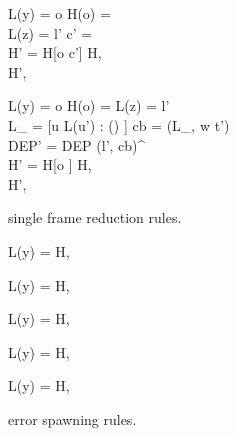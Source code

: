 \begin{figure}[h]
  {L(y) = o \andalso H(o) =  \\
  L(z) = l' \andalso c' =  \\
  H' = H[o \mapsto c']}
  {H,  \; \FRedTo \\
  H', }

  \RuleSpace{}

  {L(y) = o \andalso H(o) =  \andalso L(z) = l' \\
  L_{} = [u \mapsto L(u') : () \in {}]
  \andalso cb = (L_{}, w \Rightarrow t') \\
  \iota{} \andalso DEP' = DEP \cup (l', cb)^\iota \\
  H' = H[o \mapsto {}] }
  { H,  \\ \FRedTo \;
  H',  }
  \caption{\RACL{} single frame reduction rules.}
  \label{fig:frame_red_rules}
\end{figure}


\begin{figure}
  {L(y) = \NullVal}
  {H,  \; \FRedTo \; \Error}

  \RuleSpace{}

  {L(y) = \NullVal}
  {H,  \; \FRedTo \; \Error}

  \RuleSpace{}

  {L(y) = \NullVal}
  {H,  \; \FRedTo \; \Error}

  \RuleSpace{}

  {L(y) = \NullVal}
  {H,  \; \FRedTo \; \Error}

  \RuleSpace{}

  {L(y) = \NullVal}
  {H,   \\ \FRedTo \; \Error}
  \caption{\RACL{} error spawning rules.}
  \label{fig:error_red_rules}
\end{figure}

